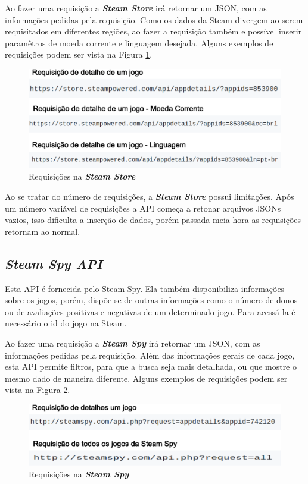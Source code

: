 Ao fazer uma requisição a \textit{\textbf{Steam Store}} irá retornar um JSON, com as informações pedidas pela requisição. Como os dados da Steam divergem ao serem requisitados em diferentes regiões, ao fazer a requisição também e possível inserir paramêtros de moeda corrente e linguagem desejada. Alguns exemplos de requisições podem ser vista na Figura \ref{image:requiStore}.
\begin{figure} [H]
\centering
\includegraphics[scale=0.5]{figuras/requisicaoStore.eps}
\caption{Requisições na \textit{\textbf{Steam Store}}}
\label{image:requiStore}
\end{figure}

Ao se tratar do número de requisições, a \textit{\textbf{Steam Store}} possui limitações. Após um número variável de requisições a API começa a retonar arquivos JSONs vazios, isso dificulta a inserção de dados, porém passada meia hora as requisições retornam ao normal.

\subsection*{\textit{Steam Spy API}}
Esta API é fornecida pelo Steam Spy. Ela também disponibiliza informações sobre os jogos, porém, dispõe-se de outras informações como o número de donos ou de avaliações positivas e negativas de um determinado jogo. Para acessá-la é necessário o id do jogo na Steam.

Ao fazer uma requisição a \textit{\textbf{Steam Spy}} irá retornar um JSON, com as informações pedidas pela requisição. Além das informações gerais de cada jogo, esta API permite filtros, para que a busca seja mais detalhada, ou que mostre o mesmo dado de maneira diferente. Alguns exemplos de requisições podem ser vista na Figura \ref{image:requiSpy}.
\begin{figure} [H]
\centering
\includegraphics[scale=0.5]{figuras/requisicaoSpy.eps}
\caption{Requisições na \textit{\textbf{Steam Spy}}}
\label{image:requiSpy}
\end{figure}

